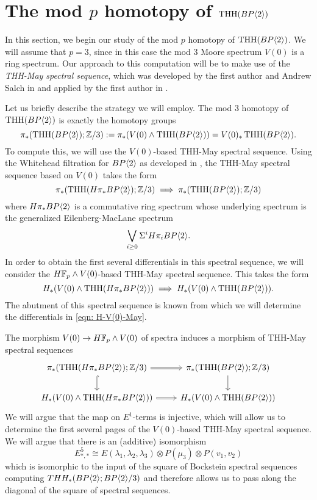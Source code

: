 
\section{The mod $p$ homotopy of $\operatorname{THH}(BP\langle 2 \rangle)$}
In this section, we begin our study of the mod $p$ homotopy of $\operatorname{THH}(BP\langle 2 \rangle)$. We will assume that $p=3$, since in this case the mod 3 Moore spectrum $V(0)$ is a ring spectrum. Our approach to this computation will be to make use of the \emph{THH-May spectral sequence}, which was developed by the first author and Andrew Salch in \cite{THH-May} and applied by the first author in \cite{THHK1-local}. 

Let us briefly describe the strategy we will employ. The mod 3 homotopy of $\operatorname{THH}(BP\langle 2 \rangle)$ is exactly the homotopy groups
\[
\pi_*(\operatorname{THH}(BP\langle 2 \rangle);\mathbb{Z}/3):= \pi_*(V(0)\wedge \operatorname{THH}(BP\langle 2 \rangle)) = V(0)_*\operatorname{THH}(BP\langle 2 \rangle).
\]
To compute this, we will use the $V(0)$-based THH-May spectral sequence. Using the Whitehead filtration for $BP\langle 2 \rangle$ as developed in \cite{THH-May}, the THH-May spectral sequence based on $V(0)$ takes the form 
\begin{equation}\label{eqn:V(0)-May}
	\pi_*(\operatorname{THH}(H\pi_*BP\langle 2 \rangle);\mathbb{Z}/3)\implies \pi_*(\operatorname{THH}(BP\langle 2 \rangle);\mathbb{Z}/3)
\end{equation}
where $H\pi_*BP\langle 2 \rangle$ is a commutative ring spectrum whose underlying spectrum is the generalized Eilenberg-MacLane spectrum 
\[ \bigvee_{i\ge 0 } \Sigma^iH\pi_iBP\langle 2 \rangle .\] 
In order to obtain the first several differentials in this spectral sequence, we will consider the $H\mathbb{F}_p\wedge V(0)$-based THH-May spectral sequence. This takes the form 
\begin{equation}\label{eqn: H-V(0)-May}
	H_*(V(0)\wedge \operatorname{THH}(H\pi_*BP\langle 2 \rangle))\implies H_*(V(0)\wedge \operatorname{THH}(BP\langle 2 \rangle)).
\end{equation}
The abutment of this spectral sequence is known from which we will determine the differentials in \eqref{eqn: H-V(0)-May}.

The morphism $V(0)\to H\mathbb{F}_p\wedge V(0)$ of spectra induces a morphism of THH-May spectral sequences
\begin{equation}\label{eqn:morphism of THH-MaySS}
\begin{tikzcd}
	\pi_*(\THH(H\pi_*\B);\Z/3)\arrow[d, hook]\arrow[r,Rightarrow]& \pi_*(\THH(\B);\Z/3)\arrow[d]\\
	 H_*(V(0)\wedge \THH(H\pi_*\B))\arrow[r, Rightarrow] & H_*(V(0)\wedge \THH(\B))
\end{tikzcd}
\end{equation}
We will argue that the map on $E^1$-terms is injective, which will allow us to determine the first several pages of the $V(0)$-based THH-May spectral sequence. We will argue that there is an (additive) isomorphism 
\[ E^5_{*,*}\cong E(\lambda_1,\lambda_2,\lambda_3)\otimes P(\mu_3)\otimes P(v_1,v_2)\]
which is isomorphic to the input of the square of Bockstein spectral sequences computing $THH_*(BP\langle 2 \rangle;BP\langle 2 \rangle/3)$ and therefore allows us to pass along the diagonal of the square of spectral sequences. 

